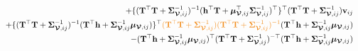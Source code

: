 \documentclass[12pt]{article}
\newcommand{\0}{\mathbf{0}}
\begin{document}
\begin{eqnarray*}
&& + \{ ( \mathbf{T}^{\top} \mathbf{T} + \boldsymbol{\Sigma}_{\boldsymbol{\mathcal{V}}, ij}^{-1} )^{-1} ( \mathbf{h}^{\top} \mathbf{T} + \boldsymbol{\mu}_{\boldsymbol{\mathcal{V}}, ij}^{\top} \boldsymbol{\Sigma}_{\boldsymbol{\mathcal{V}}, ij}^{-1} )^{\top} \}^{\top} ( \mathbf{T}^{\top} \mathbf{T} + \boldsymbol{\Sigma}_{\boldsymbol{\mathcal{V}}, ij}^{-1} ) \mathbf{v}_{ij} \\
&& + \{ ( \mathbf{T}^{\top} \mathbf{T} + \boldsymbol{\Sigma}_{\boldsymbol{\mathcal{V}}, ij}^{-1} )^{-1}  ( \mathbf{T}^{\top} \mathbf{h} + \boldsymbol{\Sigma}_{\boldsymbol{\mathcal{V}}, ij}^{-1}\boldsymbol{\mu}_{\boldsymbol{\mathcal{V}}, ij} ) \}^{\top} \textcolor{kaustorange}{( \mathbf{T}^{\top} \mathbf{T} + \boldsymbol{\Sigma}_{\boldsymbol{\mathcal{V}}, ij}^{-1} ) ( \mathbf{T}^{\top} \mathbf{T} + \boldsymbol{\Sigma}_{\boldsymbol{\mathcal{V}}, ij}^{-1} )^{-1}} ( \mathbf{T}^{\top} \mathbf{h} + \boldsymbol{\Sigma}_{\boldsymbol{\mathcal{V}}, ij}^{-1}\boldsymbol{\mu}_{\boldsymbol{\mathcal{V}}, ij} ) \\
&&- ( \mathbf{T}^{\top} \mathbf{h} + \boldsymbol{\Sigma}_{\boldsymbol{\mathcal{V}}, ij}^{-1}\boldsymbol{\mu}_{\boldsymbol{\mathcal{V}}, ij} )^{\top} ( \mathbf{T}^{\top} \mathbf{T} + \boldsymbol{\Sigma}_{\boldsymbol{\mathcal{V}}, ij}^{-1} )^{-\top} ( \mathbf{T}^{\top} \mathbf{h} + \boldsymbol{\Sigma}_{\boldsymbol{\mathcal{V}}, ij}^{-1}\boldsymbol{\mu}_{\boldsymbol{\mathcal{V}}, ij} )
\end{eqnarray*}
\end{document}

